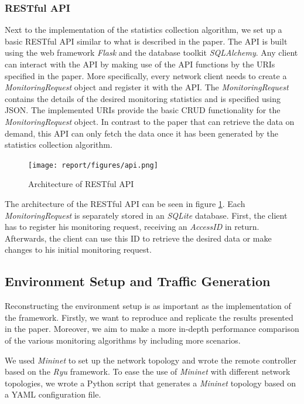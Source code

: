 \documentclass[DIV=12]{scrartcl}
\begin{document}
\subsubsection{RESTful API}
Next to the implementation of the statistics collection algorithm, we set up a basic RESTful API similar to what is described in the paper. The API is built using the web framework \textit{Flask} and the database toolkit \textit{SQLAlchemy}. Any client can interact with the API by making use of the API functions by the URIs specified in the paper. More specifically, every network client needs to create a \textit{MonitoringRequest} object and register it with the API. The \textit{MonitoringRequest} contains the details of the desired monitoring statistics and is specified using JSON. The implemented URIs provide the basic CRUD functionality for the \textit{MonitoringRequest} object. In contrast to the paper that can retrieve the data on demand, this API can only fetch the data once it has been generated by the statistics collection algorithm. 
\begin{figure}[]
  \centering
  \texttt{[image: report/figures/api.png]}
  \caption{Architecture of RESTful API}
  \label{fig:api}
\end{figure}
The architecture of the RESTful API can be seen in figure \ref{fig:api}. Each \textit{MonitoringRequest} is separately stored in an \textit{SQLite} database. First, the client has to register his monitoring request, receiving an \textit{AccessID} in return. Afterwards, the client can use this ID to retrieve the desired data or make changes to his initial monitoring request.


\subsection{Environment Setup and Traffic Generation}
Reconstructing the environment setup is as important as the implementation of the framework. Firstly, we want to reproduce and replicate the results presented in the paper. Moreover, we aim to make a more in-depth performance comparison of the various monitoring algorithms by including more scenarios.

We used \textit{Mininet} to set up the network topology and wrote the remote controller based on the \textit{Ryu} framework.
To ease the use of \textit{Mininet} with different network topologies, we wrote a Python script that generates a \textit{Mininet} topology based on a YAML configuration file.
\end{document}
